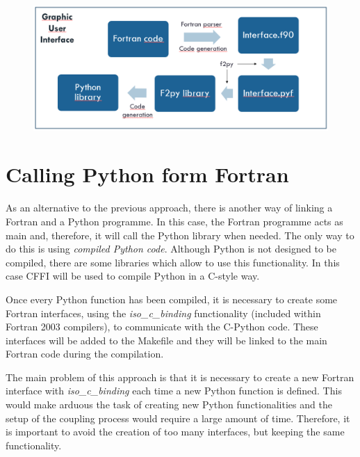 \vfill 

\begin{figure}[H]
  \centering
  \includegraphics[width=\textwidth]{./doc/Figures/fparser.PNG}
  \caption{}
  \label{fig:fparser}
\end{figure}

\newpage

\section{Calling Python form Fortran}

\noindent 
As an alternative to the previous approach, 
there is another way of linking a Fortran and a Python programme. 
In this case, the 
Fortran programme acts as main and, therefore, it will call the Python library when needed. The only way to do this is using \emph{compiled 
Python code}. Although Python is not designed to be compiled, there are some libraries which allow to use this functionality. In this case 
CFFI \cite{cffi} will be used to compile Python in a C-style way.

Once every Python function has been compiled, it is necessary to create some Fortran interfaces, using the \emph{iso\_c\_binding} 
functionality (included within Fortran 2003 compilers), to communicate with the C-Python code. These interfaces will be added to the Makefile 
and they will be linked to the main Fortran code during the compilation.

The main problem of this approach is that it is necessary to create a new Fortran interface with \emph{iso\_c\_binding} each time a new 
Python function is defined. This would make arduous the task of creating new Python functionalities and the setup of the coupling process 
would require a large amount of time. Therefore, it is important to avoid the creation of too many interfaces, but keeping the same 
functionality.

